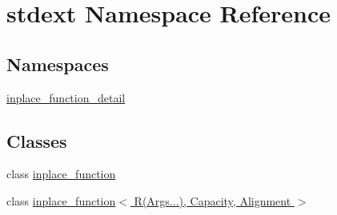\hypertarget{namespacestdext}{}\section{stdext Namespace Reference}
\label{namespacestdext}
\subsection*{Namespaces}
\begin{DoxyCompactItemize}
\item 
 \hyperlink{namespacestdext_1_1inplace__function__detail}{inplace\+\_\+function\+\_\+detail}
\end{DoxyCompactItemize}
\subsection*{Classes}
\begin{DoxyCompactItemize}
\item 
class \hyperlink{classstdext_1_1inplace__function}{inplace\+\_\+function}
\item 
class \hyperlink{classstdext_1_1inplace__function_3_01R_07Args_8_8_8_08_00_01Capacity_00_01Alignment_01_4}{inplace\+\_\+function$<$ R(\+Args...), Capacity, Alignment $>$}
\end{DoxyCompactItemize}
